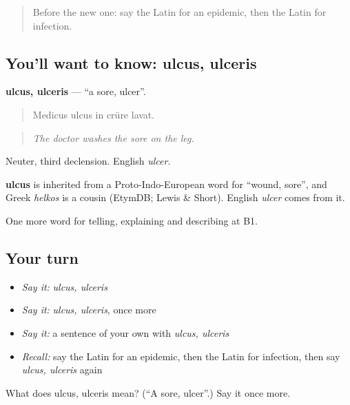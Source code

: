 \begin{quote}
Before the new one: say the Latin for an epidemic, then the Latin for infection.
\end{quote}

\subsection*{You'll want to know: ulcus, ulceris}
\textbf{ulcus, ulceris} — \textquotedblleft{}a sore, ulcer\textquotedblright{}.

\begin{quote}
Medicus ulcus in crūre lavat.
\end{quote}

\begin{quote}
\emph{The doctor washes the sore on the leg.}
\end{quote}

Neuter, third declension. English \emph{ulcer}.

\begin{cousinweb}
\textbf{ulcus} is inherited from a Proto-Indo-European word for \textquotedblleft{}wound, sore\textquotedblright{}, and Greek \emph{helkos} is a cousin (EtymDB; Lewis \& Short). English \emph{ulcer} comes from it.
\end{cousinweb}

\begin{grammarlens}[title={What you've built}]
One more word for telling, explaining and describing at B1.
\end{grammarlens}

\subsection*{Your turn}
\begin{itemize}
\raggedright
  \item \emph{Say it:} \emph{ulcus, ulceris}
  \item \emph{Say it:} \emph{ulcus, ulceris}, once more
  \item \emph{Say it:} a sentence of your own with \emph{ulcus, ulceris}
  \item \emph{Recall:} say the Latin for an epidemic, then the Latin for infection, then say \emph{ulcus, ulceris} again
\end{itemize}

\begin{tcolorbox}[breakable,colback=teal!4,colframe=teal!35!black,title={Before you move on}]
What does ulcus, ulceris mean? (\textquotedblleft{}A sore, ulcer\textquotedblright{}.) Say it once more.
\end{tcolorbox}
